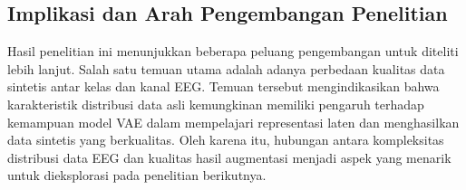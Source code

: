 

\subsection{Implikasi dan Arah Pengembangan Penelitian}

Hasil penelitian ini menunjukkan beberapa peluang pengembangan untuk diteliti lebih lanjut. Salah satu temuan utama adalah adanya perbedaan kualitas data sintetis antar kelas dan kanal EEG. Temuan tersebut mengindikasikan bahwa karakteristik distribusi data asli kemungkinan memiliki pengaruh terhadap kemampuan model VAE dalam mempelajari representasi laten dan menghasilkan data sintetis yang berkualitas. Oleh karena itu, hubungan antara kompleksitas distribusi data EEG dan kualitas hasil augmentasi menjadi aspek yang menarik untuk dieksplorasi pada penelitian berikutnya.

